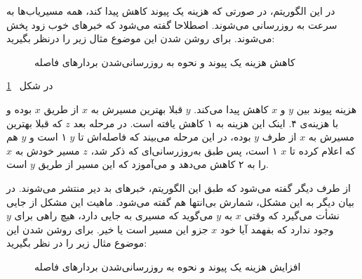   در این الگوریتم، در صورتی که هزینه یک پیوند کاهش پیدا کند، همه مسیریاب‌ها به سرعت به روزرسانی می‌شوند. اصطلاحا گفته می‌شود که خبرهای خوب زود پخش می‌شوند. برای روشن شدن این موضوع مثال زیر را درنظر بگیرید:
  

 \begin{figure}[H]
\centering
{}
\caption{کاهش هزینه یک پیوند و نحوه به روزرسانی‌شدن بردار‌های فاصله}
\label{fig:goodnews}
\end{figure}
 

 در شکل 
 ~\ref{fig:goodnews}

 هزینه پیوند بین $y$ و $x$ کاهش پیدا می‌کند. $y$ قبلا بهترین مسیرش به $x$ از طریق $x$ بوده و با هزینه‌ی ۴. اینک این هزینه به ۱ کاهش یافته است. در مرحله بعد $z$ که قبلا بهترین مسیرش به $x$ از طرف $y$ بوده، در این مرحله می‌بیند که فاصله‌اش تا $y$ ۱ است و $y$ هم که اعلام کرده تا $x$ ۱ است، پس طبق به‌روزرسانی‌ای که ذکر شد، $z$  مسیر خودش به $x$ را به ۲ کاهش می‌دهد و می‌آموزد که این مسیر از طریق $y$ است. 
 
 از طرف دیگر گفته می‌شود که طبق این الگوریتم، خبرهای بد دیر منتشر می‌شوند. در بیان دیگر به این مشکل، شمارش بی‌انتها هم گفته می‌شود. ماهیت این مشکل از جایی نشأت می‌گیرد که وقتی $x$ به $y$ می‌گوید که مسیری به جایی دارد، هیچ راهی برای $y$ وجود ندارد که بفهمد آیا خود $x$ جزو این مسیر است یا خیر. برای روشن شدن این موضوع مثال زیر را در نظر بگیرید: 
 
 \begin{figure}[H]
\centering
{}
\caption{افزایش هزینه یک پیوند و نحوه به روزرسانی‌شدن بردار‌های فاصله}
\label{fig:badnews}
\end{figure}
 
